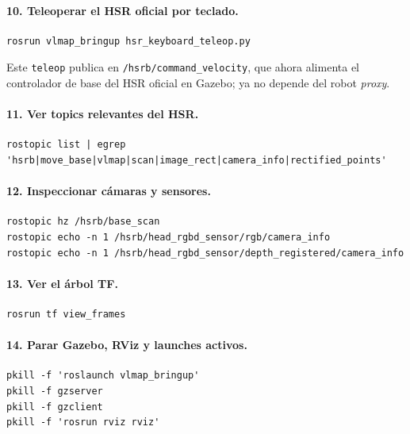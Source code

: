 \documentclass[11pt,a4paper]{article}
\begin{document}
\paragraph{10. Teleoperar el HSR oficial por teclado.}

\begin{verbatim}
rosrun vlmap_bringup hsr_keyboard_teleop.py
\end{verbatim}

Este \texttt{teleop} publica en \texttt{/hsrb/command\_velocity}, que ahora
alimenta el controlador de base del HSR oficial en Gazebo; ya no depende del
robot \emph{proxy}.

\paragraph{11. Ver topics relevantes del HSR.}

\begin{verbatim}
rostopic list | egrep 'hsrb|move_base|vlmap|scan|image_rect|camera_info|rectified_points'
\end{verbatim}

\paragraph{12. Inspeccionar cámaras y sensores.}

\begin{verbatim}
rostopic hz /hsrb/base_scan
rostopic echo -n 1 /hsrb/head_rgbd_sensor/rgb/camera_info
rostopic echo -n 1 /hsrb/head_rgbd_sensor/depth_registered/camera_info
\end{verbatim}

\paragraph{13. Ver el árbol TF.}

\begin{verbatim}
rosrun tf view_frames
\end{verbatim}

\paragraph{14. Parar Gazebo, RViz y launches activos.}

\begin{verbatim}
pkill -f 'roslaunch vlmap_bringup'
pkill -f gzserver
pkill -f gzclient
pkill -f 'rosrun rviz rviz'
\end{verbatim}
\end{document}
